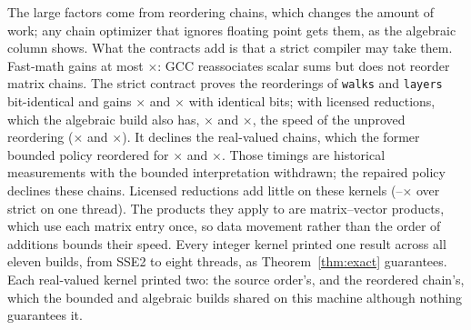 \documentclass[acmsmall,review,anonymous,nonacm]{acmart}
\begin{document}
The large factors come from reordering chains, which changes the amount of work;
any chain optimizer that ignores floating point gets them, as the algebraic
column shows. What the contracts add is that a strict compiler may take them.
Fast-math gains at most \RqEtoeFastMathHi$\times$: GCC reassociates scalar sums
but does not reorder matrix chains. The strict contract proves the reorderings of
\texttt{walks} and \texttt{layers} bit-identical and gains
\RqEtoeWalksStrict$\times$ and \RqEtoeLayersStrict$\times$ with identical bits;
with licensed reductions, which the algebraic build also has,
\PlatWalksClausesFirstGcc$\times$ and \PlatLayersClausesFirstGcc$\times$, the
speed of the unproved reordering (\PlatWalksAlgebraicFirstGcc$\times$ and
\PlatLayersAlgebraicFirstGcc$\times$). It declines the real-valued chains, which
the former bounded policy reordered for
\RqEtoeLowrankBoundedLicensed$\times$ and
\RqEtoeDiffusionBoundedLicensed$\times$. Those timings are historical
measurements with the bounded interpretation withdrawn; the repaired policy
declines these chains. Licensed reductions add little on these
kernels (\RqEtoeLicenseGainLo--\RqEtoeLicenseGainHi$\times$ over strict on one
thread). The products they apply to are matrix--vector products, which use each
matrix entry once, so data movement rather than the order of additions bounds
their speed. Every integer kernel printed one result across all eleven builds,
from SSE2 to eight threads, as Theorem~\ref{thm:exact} guarantees. Each
real-valued kernel printed two: the source order's, and the reordered chain's,
which the bounded and algebraic builds shared on this machine although nothing
guarantees it.
\end{document}
